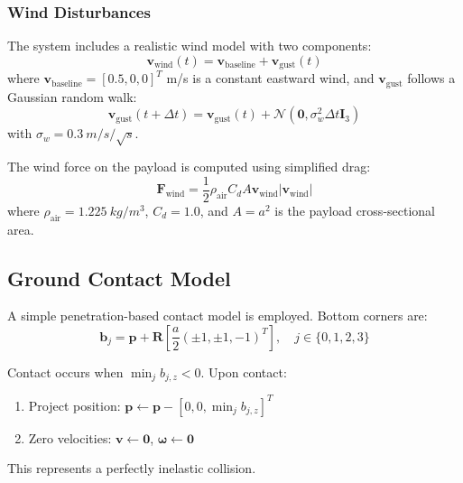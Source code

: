 \documentclass[12pt,a4paper]{article}
\begin{document}
\subsubsection{Wind Disturbances}
The system includes a realistic wind model with two components:
\begin{equation}
    \mathbf{v}_{\text{wind}}(t) = \mathbf{v}_{\text{baseline}} + \mathbf{v}_{\text{gust}}(t)
    \label{eq:wind_model}
\end{equation}
where $\mathbf{v}_{\text{baseline}} = [0.5, 0, 0]^T$ m/s is a constant eastward wind, and $\mathbf{v}_{\text{gust}}$ follows a Gaussian random walk:
\begin{equation}
    \mathbf{v}_{\text{gust}}(t + \Delta t) = \mathbf{v}_{\text{gust}}(t) + \mathcal{N}(\mathbf{0}, \sigma_w^2 \Delta t \mathbf{I}_3)
\end{equation}
with $\sigma_w = \SI{0.3}{m/s/\sqrt{s}}$.

The wind force on the payload is computed using simplified drag:
\begin{equation}
    \mathbf{F}_{\text{wind}} = \frac{1}{2}\rho_{\text{air}} C_d A \mathbf{v}_{\text{wind}} |\mathbf{v}_{\text{wind}}|
    \label{eq:wind_force}
\end{equation}
where $\rho_{\text{air}} = \SI{1.225}{kg/m^3}$, $C_d = 1.0$, and $A = a^2$ is the payload cross-sectional area.

\subsection{Ground Contact Model}

A simple penetration-based contact model is employed. Bottom corners are:
\begin{equation}
    \mathbf{b}_j = \mathbf{p} + \mathbf{R}\left[\frac{a}{2}(\pm 1, \pm 1, -1)^T\right], \quad j \in \{0,1,2,3\}
\end{equation}

Contact occurs when $\min_j b_{j,z} < 0$. Upon contact:
\begin{enumerate}
    \item Project position: $\mathbf{p} \leftarrow \mathbf{p} - [0, 0, \min_j b_{j,z}]^T$
    \item Zero velocities: $\mathbf{v} \leftarrow \mathbf{0}$, $\boldsymbol{\omega} \leftarrow \mathbf{0}$
\end{enumerate}
This represents a perfectly inelastic collision.

\end{document}
